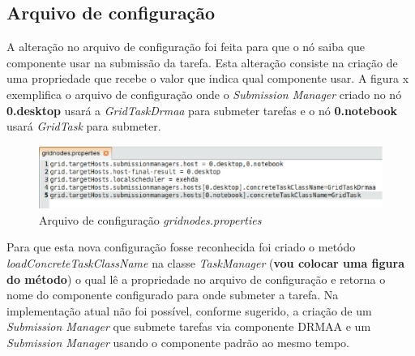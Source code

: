 \subsection{Arquivo de configuração}

A alteração no arquivo de configuração foi feita para que o nó saiba que componente usar na submissão da tarefa. Esta alteração consiste na criação de uma propriedade que recebe o valor que indica qual componente usar. A figura x exemplifica o arquivo de configuração onde o \emph{Submission Manager} criado no nó \textbf{0.desktop} usará a \emph{GridTaskDrmaa} para submeter tarefas e o nó \textbf{0.notebook} usará \emph{GridTask} para submeter.

\begin{figure}[htb]
\begin{center}
\includegraphics[scale=0.5]{./img/gridnodes_properties.eps}
\caption{Arquivo de configuração \emph{gridnodes.properties}}
\label{fig:gridonodes_properties}
\end{center}
\end{figure}

Para que esta nova configuração fosse reconhecida foi criado o metódo \emph{loadConcreteTaskClassName} na classe \emph{TaskManager} (\textbf{vou colocar uma figura do método}) o qual lê a propriedade no arquivo de configuração e retorna o nome do componente configurado para onde submeter a tarefa. Na implementação atual não foi possível, conforme sugerido, a criação de um \emph{Submission Manager} que submete tarefas via componente DRMAA e um \emph{Submission Manager} usando o componente padrão ao mesmo tempo.